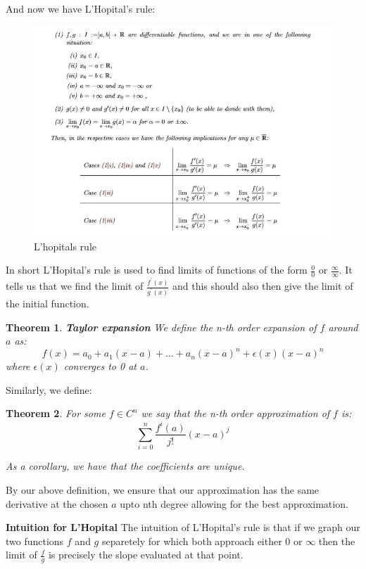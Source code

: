 \documentclass[titlepage]{article}
\newtheorem{theorem}{Theorem}[section]
\begin{document}
And now we have L'Hopital's rule:

\begin{figure}[H]
    \centering
    \includegraphics{epflLectureNotes/analysis/figures/lhopital.JPG}
    \caption{L'hopitals rule}
    \label{fig:my_label}
\end{figure}

In short L'Hopital's rule is used to find limits of functions of the form $\frac{0}{0}$ or $\frac{\infty}{\infty}$. It tells us that we find the limit of $\frac{f^{\prime}(x)}{g^{\prime}(x)}$ and this should also then give the limit of the initial function. 

\begin{theorem}\textbf{Taylor expansion}
We define the n-th order expansion of $f$ around $a$ as:
$$f(x) = a_{0} + a_{1}(x-a) + \hdots + a_{n}(x-a)^{n} + \epsilon(x)(x-a)^{n}$$ where $\epsilon(x)$ converges to 0 at $a$. 
\end{theorem}

Similarly, we define:

\begin{theorem}
For some $f \in C^{n}$ we say that the n-th order approximation of $f$ is:
$$\sum_{i=0}^{n}\frac{f^{i}(a)}{j!}(x-a)^j$$

As a corollary, we have that the coefficients are unique. 
\end{theorem}

By our above definition, we ensure that our approximation has the same derivative at the chosen $a$ upto nth degree allowing for the best approximation. 

\begin{tcolorbox}\textbf{Intuition for L'Hopital}
The intuition of L'Hopital's rule is that if we graph our two functions $f$ and $g$ separetely for which both approach either $0$ or $\infty$ then the limit of $\frac{f}{g}$ is precisely the slope evaluated at that point. 
\end{tcolorbox}
\end{document}
